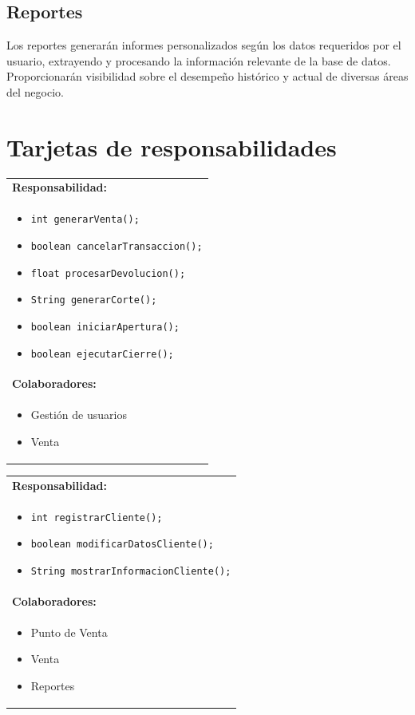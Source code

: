 \documentclass{article}
\begin{document}
\subsection{Reportes}
Los reportes generarán informes personalizados según los datos requeridos por el usuario, extrayendo y procesando la información relevante de la base de datos. Proporcionarán visibilidad sobre el desempeño histórico y actual de diversas áreas del negocio.\\

\newpage




\section{Tarjetas de responsabilidades}
\newcommand{\tarjeta}[3]{
\begin{tcolorbox}[colback=gray!10, colframe=black, width=1\textwidth, halign=center, title=#1]
\begin{tabularx}{\linewidth}{X}
\textbf{Responsabilidad:} \\
#2 \\
\textbf{Colaboradores:} \\
#3
\end{tabularx}
\end{tcolorbox}
}

\vspace{0.1cm}

\noindent\begin{minipage}[t]{0.48\textwidth}
\tarjeta{Punto de venta}{
\begin{itemize}
\item \texttt{int generarVenta();}
\item \texttt{boolean cancelarTransaccion();}
\item \texttt{float procesarDevolucion();}
\item \texttt{String generarCorte();}
\item \texttt{boolean iniciarApertura();}
\item \texttt{boolean ejecutarCierre();}
\end{itemize}
}{
\begin{itemize}
\item Gestión de usuarios
\item Venta
\end{itemize}
}
\end{minipage}
\hfill
\begin{minipage}[t]{0.48\textwidth}
\tarjeta{Cliente}{
\begin{itemize}
\item \texttt{int registrarCliente();}
\item \texttt{boolean modificarDatosCliente();}
\item \texttt{String mostrarInformacionCliente();}
\end{itemize}
}{
\begin{itemize}
\item Punto de Venta
\item Venta
\item Reportes
\end{itemize}
}
\end{minipage}
\end{document}
